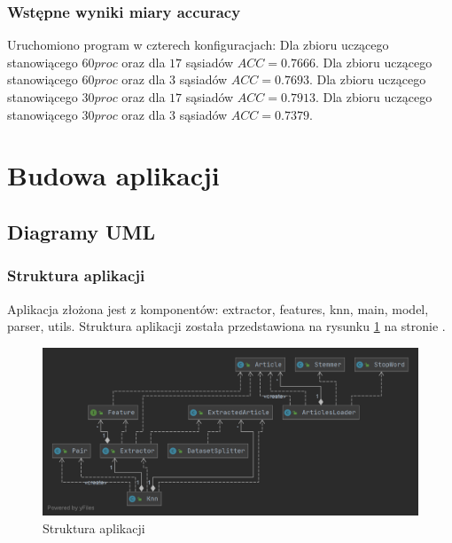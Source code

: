 \documentclass{classrep}
\begin{document}
\subsubsection{Wstępne wyniki miary accuracy}
Uruchomiono program w czterech konfiguracjach:
\newline Dla zbioru uczącego stanowiącego $60 proc$ oraz dla $17$ sąsiadów $ACC=0.7666$.
\newline Dla zbioru uczącego stanowiącego $60 proc$ oraz dla $3$ sąsiadów $ACC=0.7693$.
\newline Dla zbioru uczącego stanowiącego $30 proc$ oraz dla $17$ sąsiadów $ACC=0.7913$.
\newline Dla zbioru uczącego stanowiącego $30 proc$ oraz dla $3$ sąsiadów $ACC=0.7379$.



\section{Budowa aplikacji}
\subsection{Diagramy UML}

\subsubsection{Struktura aplikacji}
Aplikacja złożona jest z komponentów: extractor, features, knn, main, model, parser, utils. Struktura aplikacji została przedstawiona na rysunku \ref{app} na stronie \pageref{app}.

\begin{figure}
\label{app}
\includegraphics[scale=0.35]{App structure}
\caption{Struktura aplikacji}
\end{figure}
\end{document}
